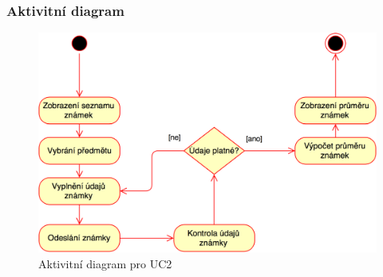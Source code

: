 \documentclass[a4paper,10pt,titlepage]{article}
\begin{document}
	\subsubsection*{Aktivitní diagram}
		\begin{figure}[H]
			\centering
					\includegraphics[width=\textwidth]{vis_uc2_activity}
			\caption{Aktivitní diagram pro UC2}
		\end{figure}
	\vspace{5mm}
	
\end{document}

